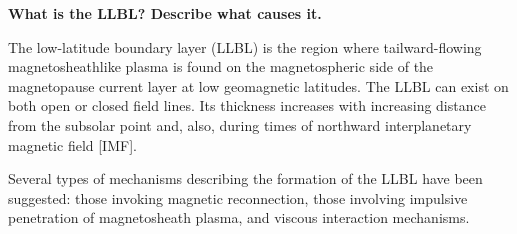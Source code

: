 \textbf{What is the LLBL? Describe what causes it.}

The low-latitude boundary layer (LLBL) is the region where
tailward-flowing magnetosheathlike plasma is found on the magnetospheric side of the
magnetopause current layer at low geomagnetic latitudes. The LLBL can
exist on both open or closed field lines. Its thickness increases with
increasing distance from the subsolar point and, also, during times of
northward interplanetary magnetic field [IMF]. 

Several types of mechanisms describing the formation of the LLBL have been
suggested: those invoking magnetic reconnection, those involving
impulsive penetration of magnetosheath plasma, and viscous interaction
mechanisms.

\citet{scholer1997}
